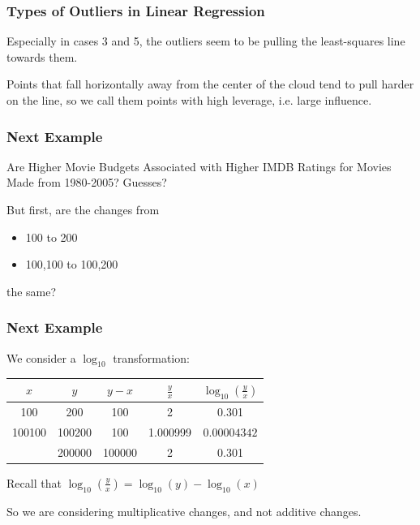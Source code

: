 \documentclass[slides]{beamer}
\newcommand{\blue}[1]{\textcolor{blue2}{#1}}
\begin{document}
\begin{frame}[fragile]
\frametitle{Types of Outliers in Linear Regression}
Especially in cases 3 and 5, the outliers seem to be pulling the least-squares line towards them.

\vspace{0.5cm}
\pause
Points that fall horizontally away from the center of the cloud tend to pull harder on the line, so we call them points with high \blue{leverage}, i.e. large influence.  

\end{frame}


\begin{frame}[fragile]
\frametitle{Next Example}

Are Higher Movie Budgets Associated with Higher IMDB Ratings for Movies Made from 1980-2005?  Guesses?

\vspace{0.5cm}

\pause But first, are the changes from
\begin{itemize}
\item 100 to 200
\item 100,100 to 100,200
\end{itemize}
the same?


\end{frame}


\begin{frame}[fragile]
\frametitle{Next Example}
We consider a $\log_{10}$ transformation:

\begin{center}
  \begin{tabular}{cc|c|cc}
    $x$ & $y$ & $y-x$ & $\frac{y}{x}$ & $\log_{10}\left(\frac{y}{x}\right)$\\ 
\hline
    100 & 200 & 100 & 2 & 0.301\\ 
    100100 & 100200 & 100 & 1.000999 & $0.00004342$\\ 
    \pause 100000 & 200000 & 100000 & 2& \blue{0.301} \\ 
  \end{tabular}
\end{center}

\pause Recall that $\log_{10}\left(\frac{y}{x}\right) = \log_{10}(y) - \log_{10}(x)$

\vspace{0.5cm}

\pause So we are considering \blue{multiplicative} changes, and not \blue{additive} changes.


\end{frame}
\end{document}

